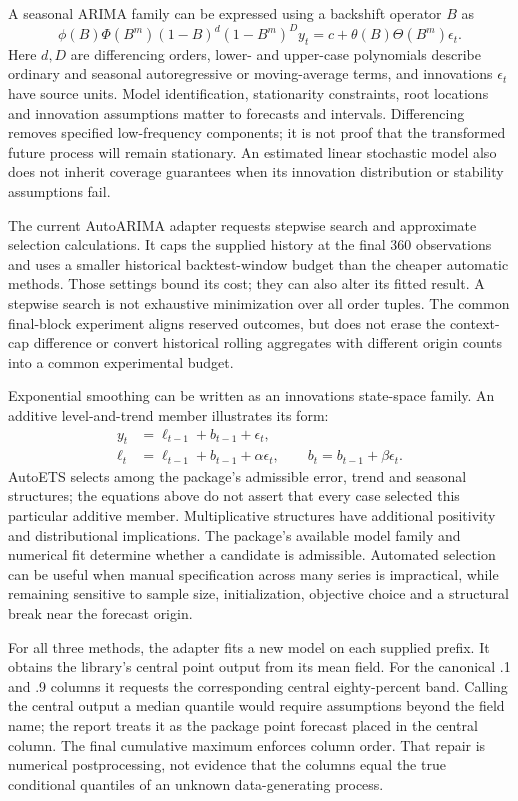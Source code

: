 A seasonal ARIMA family can be expressed using a backshift operator $B$ as
\begin{equation}\label{eq:report-arima}
\phi(B)\Phi(B^m)(1-B)^d(1-B^m)^D y_t
=c+\theta(B)\Theta(B^m)\epsilon_t.
\end{equation}
Here $d,D$ are differencing orders, lower- and upper-case polynomials describe ordinary and seasonal autoregressive or moving-average terms, and innovations $\epsilon_t$ have source units. Model identification, stationarity constraints, root locations and innovation assumptions matter to forecasts and intervals. Differencing removes specified low-frequency components; it is not proof that the transformed future process will remain stationary. An estimated linear stochastic model also does not inherit coverage guarantees when its innovation distribution or stability assumptions fail.

The current AutoARIMA adapter requests stepwise search and approximate selection calculations. It caps the supplied history at the final 360 observations and uses a smaller historical backtest-window budget than the cheaper automatic methods. Those settings bound its cost; they can also alter its fitted result. A stepwise search is not exhaustive minimization over all order tuples. The common final-block experiment aligns reserved outcomes, but does not erase the context-cap difference or convert historical rolling aggregates with different origin counts into a common experimental budget.

Exponential smoothing can be written as an innovations state-space family. An additive level-and-trend member illustrates its form:
\begin{align}\label{eq:report-ets-state}
y_t&=\ell_{t-1}+b_{t-1}+\epsilon_t,\\
\ell_t&=\ell_{t-1}+b_{t-1}+\alpha\epsilon_t,\qquad
b_t=b_{t-1}+\beta\epsilon_t.
\end{align}
AutoETS selects among the package's admissible error, trend and seasonal structures; the equations above do not assert that every case selected this particular additive member. Multiplicative structures have additional positivity and distributional implications. The package's available model family and numerical fit determine whether a candidate is admissible. Automated selection can be useful when manual specification across many series is impractical, while remaining sensitive to sample size, initialization, objective choice and a structural break near the forecast origin.

For all three methods, the adapter fits a new model on each supplied prefix. It obtains the library's central point output from its mean field. For the canonical .1 and .9 columns it requests the corresponding central eighty-percent band. Calling the central output a median quantile would require assumptions beyond the field name; the report treats it as the package point forecast placed in the central column. The final cumulative maximum enforces column order. That repair is numerical postprocessing, not evidence that the columns equal the true conditional quantiles of an unknown data-generating process.

